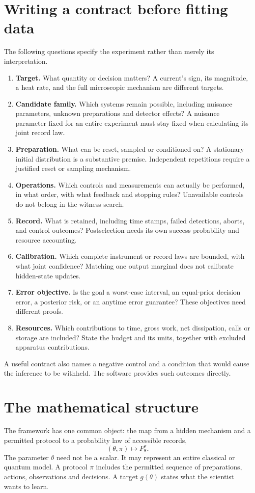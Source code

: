 \section{Writing a contract before fitting data}
The following questions specify the experiment rather than merely its interpretation.
\begin{enumerate}
\item \textbf{Target.} What quantity or decision matters? A current's sign, its magnitude, a heat rate, and the full microscopic mechanism are different targets.
\item \textbf{Candidate family.} Which systems remain possible, including nuisance parameters, unknown preparations and detector effects? A nuisance parameter fixed for an entire experiment must stay fixed when calculating its joint record law.
\item \textbf{Preparation.} What can be reset, sampled or conditioned on? A stationary initial distribution is a substantive premise. Independent repetitions require a justified reset or sampling mechanism.
\item \textbf{Operations.} Which controls and measurements can actually be performed, in what order, with what feedback and stopping rules? Unavailable controls do not belong in the witness search.
\item \textbf{Record.} What is retained, including time stamps, failed detections, aborts, and control outcomes? Postselection needs its own success probability and resource accounting.
\item \textbf{Calibration.} Which complete instrument or record laws are bounded, with what joint confidence? Matching one output marginal does not calibrate hidden-state updates.
\item \textbf{Error objective.} Is the goal a worst-case interval, an equal-prior decision error, a posterior risk, or an anytime error guarantee? These objectives need different proofs.
\item \textbf{Resources.} Which contributions to time, gross work, net dissipation, calls or storage are included? State the budget and its units, together with excluded apparatus contributions.
\end{enumerate}
A useful contract also names a negative control and a condition that would cause the inference to be withheld. The software provides such outcomes directly.

\section{The mathematical structure}
The framework has one common object: the map from a hidden mechanism and a permitted protocol to a probability law of accessible records,
\[
 (\theta,\pi)\longmapsto P_\theta^\pi.
\]
The parameter $\theta$ need not be a scalar. It may represent an entire classical or quantum model. A protocol $\pi$ includes the permitted sequence of preparations, actions, observations and decisions. A target $g(\theta)$ states what the scientist wants to learn.

